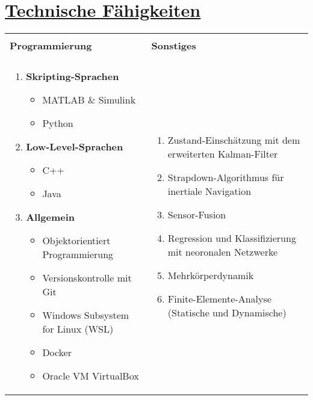 \section{\underline{Technische Fähigkeiten}}
\vspace{-1.5 em}
\begin{table}[H]
	\centering
	\begin{tabularx}{\textwidth}{|>{\setlength\hsize{1\hsize}\setlength\linewidth{1\hsize}}X|>{\setlength\hsize{1\hsize}\setlength\linewidth{1\hsize}}X|}
		\hline
		&\\[-2 ex]
		\large{\textbf{Programmierung}} & \large{\textbf{Sonstiges}}\\[0.05 in]
		\hline
		&\\[-5 ex]
		\begin{enumerate}
		\item\large{\textbf{Skripting-Sprachen}}
		\begin{itemize}
			\item\large{MATLAB $\&$ Simulink}
			\item\large{Python}
		\end{itemize}
		\item\large{\textbf{Low-Level-Sprachen}}
		\begin{itemize}
			\item\large{C++}
			\item\large{Java}
		\end{itemize}
		\item\large{\textbf{Allgemein}}
		\begin{itemize}
			\item Objektorientiert Programmierung
			\item Versionskontrolle mit Git
			\item Windows Subsystem for Linux (WSL)
			\item Docker
			\item Oracle VM VirtualBox
		\end{itemize}
	\end{enumerate} & \begin{enumerate}
			\item\large{Zustand-Einschätzung mit dem erweiterten Kalman-Filter}
			\item\large{Strapdown-Algorithmus für inertiale Navigation}
			\item\large{Sensor-Fusion}
			\item\large{Regression und Klassifizierung mit neoronalen Netzwerke}
			\item\large{Mehrkörperdynamik}
			\item\large{Finite-Elemente-Analyse (Statische und Dynamische)}
			\end{enumerate}\\
		\hline
	\end{tabularx}
\end{table}
